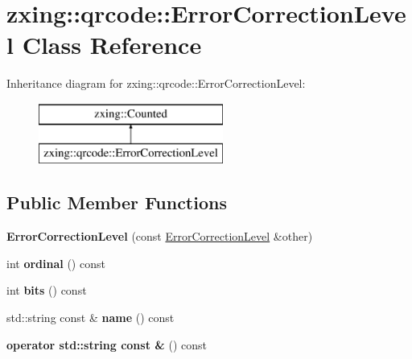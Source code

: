 \hypertarget{classzxing_1_1qrcode_1_1_error_correction_level}{}\section{zxing\+:\+:qrcode\+:\+:Error\+Correction\+Level Class Reference}
\label{classzxing_1_1qrcode_1_1_error_correction_level}
Inheritance diagram for zxing\+:\+:qrcode\+:\+:Error\+Correction\+Level\+:\begin{figure}[H]
\begin{center}
\leavevmode
\includegraphics[height=2.000000cm]{classzxing_1_1qrcode_1_1_error_correction_level}
\end{center}
\end{figure}
\subsection*{Public Member Functions}
\begin{DoxyCompactItemize}
\item 
\mbox{\label{classzxing_1_1qrcode_1_1_error_correction_level_a7f5e6d795273b0ad541c4883f855a7b7}} 
{\bfseries Error\+Correction\+Level} (const \mbox{\hyperlink{classzxing_1_1qrcode_1_1_error_correction_level}{Error\+Correction\+Level}} \&other)
\item 
\mbox{\label{classzxing_1_1qrcode_1_1_error_correction_level_a0c99f8a57ce0e58332c26e5487f529b6}} 
int {\bfseries ordinal} () const
\item 
\mbox{\label{classzxing_1_1qrcode_1_1_error_correction_level_a26efbda0c3d4e818919a394b793b1e4d}} 
int {\bfseries bits} () const
\item 
\mbox{\label{classzxing_1_1qrcode_1_1_error_correction_level_a6cbe1f1e39bebfd57398bfc57d0946eb}} 
std\+::string const  \& {\bfseries name} () const
\item 
\mbox{\label{classzxing_1_1qrcode_1_1_error_correction_level_a8e316a6ae7d8198a9a98ed304220d2ac}} 
{\bfseries operator std\+::string const \&} () const
\end{DoxyCompactItemize}
